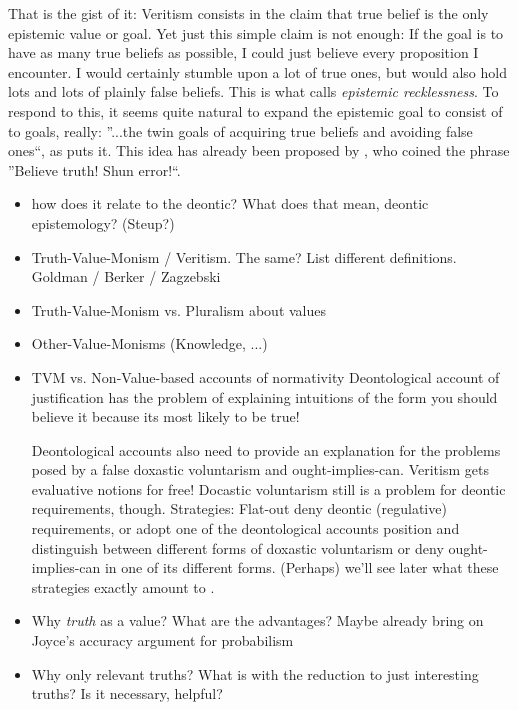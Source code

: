 \documentclass[11pt,numbers=noenddot]{scrartcl}
\begin{document}
That is the gist of it: Veritism consists in the claim that true belief is the only epistemic value or goal. Yet just this simple claim is not enough: If the goal is to have as many true beliefs as possible, I could just believe every proposition I encounter. I would certainly stumble upon a lot of true ones, but would also hold lots and lots of plainly false beliefs. This is what \citet[360]{Berker2013-BERETA-2} calls \emph{epistemic recklessness}. To respond to this, it seems quite natural to expand the epistemic goal to consist of to goals, really: ”...the twin goals of acquiring true beliefs and avoiding false ones“, as \citet[339]{Berker2013-BERETA-2} puts it. This idea has already been proposed by \citet[17]{James1896-JAMTWT-19}, who coined the phrase ”Believe truth! Shun error!“.
\begin{itemize}
    
    \item how does it relate to the deontic? What does that mean, deontic epistemology? (Steup?)
    \item Truth-Value-Monism / Veritism. The same? List different definitions. Goldman / Berker / Zagzebski 
    \item Truth-Value-Monism vs. Pluralism about values 
    \item Other-Value-Monisms (Knowledge, ...) 
    \item TVM vs. Non-Value-based accounts of normativity 
    Deontological account of justification has the problem of explaining intuitions of the form you should believe it because its most likely to be true!

    Deontological accounts also need to provide an explanation for the problems posed by a false doxastic voluntarism and ought-implies-can. Veritism gets evaluative notions for free! Docastic voluntarism still is a problem for deontic requirements, though. Strategies: Flat-out deny deontic (regulative) requirements, or adopt one of the deontological accounts position and distinguish between different forms of doxastic voluntarism or deny ought-implies-can in one of its different forms. (Perhaps) we'll see later what these strategies exactly amount to .
    \item Why \emph{truth} as a value? What are the advantages? Maybe already bring on Joyce's accuracy argument for probabilism 
    \item Why only relevant truths? What is with the reduction to just interesting truths? Is it necessary, helpful? 
\end{itemize}
\end{document}
